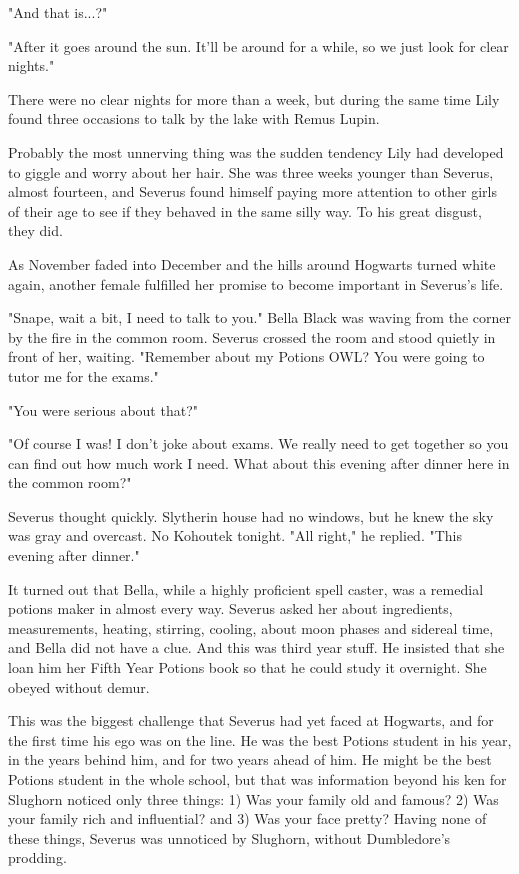 \documentclass[a4paper,11pt]{article}
\begin{document}
"And that is...?"

"After it goes around the sun. It'll be around for a while, so we just look for clear nights."

There were no clear nights for more than a week, but during the same time Lily found three occasions to talk by the lake with Remus Lupin.

Probably the most unnerving thing was the sudden tendency Lily had developed to giggle and worry about her hair. She was three weeks younger than Severus, almost fourteen, and Severus found himself paying more attention to other girls of their age to see if they behaved in the same silly way. To his great disgust, they did.

As November faded into December and the hills around Hogwarts turned white again, another female fulfilled her promise to become important in Severus's life.

"Snape, wait a bit, I need to talk to you." Bella Black was waving from the corner by the fire in the common room. Severus crossed the room and stood quietly in front of her, waiting. "Remember about my Potions OWL? You were going to tutor me for the exams."

"You were serious about that?"

"Of course I was! I don't joke about exams. We really need to get together so you can find out how much work I need. What about this evening after dinner here in the common room?"

Severus thought quickly. Slytherin house had no windows, but he knew the sky was gray and overcast. No Kohoutek tonight. "All right," he replied. "This evening after dinner."

It turned out that Bella, while a highly proficient spell caster, was a remedial potions maker in almost every way. Severus asked her about ingredients, measurements, heating, stirring, cooling, about moon phases and sidereal time, and Bella did not have a clue. And this was third year stuff. He insisted that she loan him her Fifth Year Potions book so that he could study it overnight. She obeyed without demur.

This was the biggest challenge that Severus had yet faced at Hogwarts, and for the first time his ego was on the line. He was the best Potions student in his year, in the years behind him, and for two years ahead of him. He might be the best Potions student in the whole school, but that was information beyond his ken for Slughorn noticed only three things: 1) Was your family old and famous? 2) Was your family rich and influential? and 3) Was your face pretty? Having none of these things, Severus was unnoticed by Slughorn, without Dumbledore's prodding.
\end{document}
